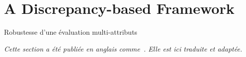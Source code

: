 
\newpage

\section{A Discrepancy-based Framework}{Robustesse d'une évaluation multi-attributs}


\label{app:sec:robustness}






\stars



\textit{Cette section a été publiée en anglais comme~\cite{raimbault2017discrepancy}. Elle est ici traduite et adaptée.}


\stars


